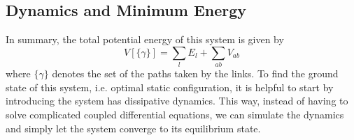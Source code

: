 \documentclass[nofootinbib,preprint,floatfix,titlepage,endfloats,superscriptaddress]{revtex4} %
\begin{document}
\subsection{Dynamics and Minimum Energy\label{ap:eom}}
In summary, the total potential energy of this system is given by
\begin{equation}
V[\{\gamma\}] = \sum_l E_l + \sum_{ab} V_{ab} \label{eq:V}
\end{equation}
where $\{\gamma\}$ denotes the set of the paths taken by the links. 
To find the ground state of this system, i.e. optimal static configuration, it is helpful to start by introducing the system has dissipative dynamics. This way, instead of having to solve complicated coupled differential equations, we can simulate the dynamics and simply let the system converge to its equilibrium state. 
\end{document}
